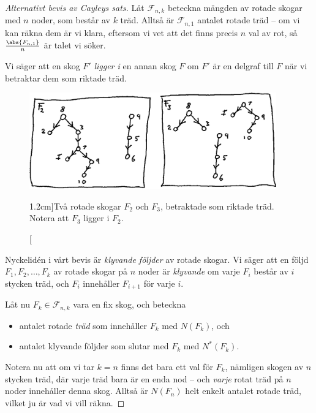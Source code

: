 \documentclass[nobib]{tufte-handout}
\begin{document}
\begin{proof}[Alternativt bevis av Cayleys sats]
    Låt $\mathcal{F}_{n,k}$ beteckna mängden av rotade skogar med $n$ noder, som består av $k$ träd. Alltså är $\mathcal{F}_{n,1}$ antalet rotade träd -- om vi kan räkna dem är vi klara, eftersom vi vet att det finns precis $n$ val av rot, så $\frac{\abs{F_{n,1}}}{n}$ är talet vi söker.

    Vi säger att en skog $F'$ \emph{ligger i} en annan skog $F$ om $F'$ är en delgraf till $F$ när vi betraktar dem som riktade träd.

    \begin{figure}
        \centering
        \includegraphics[width=0.95\textwidth]{graphics/rooted_forest_subforest.png}
        \caption[][1.2cm]{Två rotade skogar $F_2$ och $F_3$, betraktade som riktade träd. Notera att $F_3$ ligger i $F_2$.}
        \label{fig:two_rooted_forests}
    \end{figure}

    Nyckelidén i vårt bevis är \emph{klyvande följder} av rotade skogar. Vi säger att en följd $F_1, F_2,\ldots, F_k$ av rotade skogar på $n$ noder är \emph{klyvande} om varje $F_i$ består av $i$ stycken träd, och $F_{i}$ innehåller $F_{i+1}$ för varje $i$.

    Låt nu $F_k \in \mathcal{F}_{n,k}$ vara en fix skog, och beteckna
    \begin{itemize}
        \item antalet rotade \emph{träd} som innehåller $F_k$ med $N(F_k)$, och
        \item antalet klyvande följder som slutar med $F_k$ med $N^*(F_k)$.
    \end{itemize}

    Notera nu att om vi tar $k = n$ finns det bara ett val för $F_k$, nämligen skogen av $n$ stycken träd, där varje träd bara är en enda nod -- och \emph{varje} rotat träd på $n$ noder innehåller denna skog. Alltså är $N(F_n)$ helt enkelt antalet rotade träd, vilket ju är vad vi vill räkna.


\end{proof}
\end{document}
